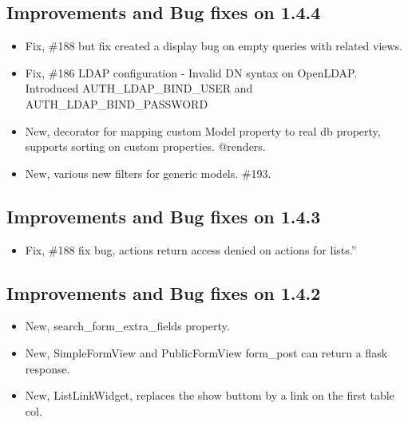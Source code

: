 \documentclass[letterpaper,10pt,english]{sphinxmanual}
\begin{document}
\subsection{Improvements and Bug fixes on 1.4.4}
\label{versions:improvements-and-bug-fixes-on-1-4-4}\begin{itemize}
\item {} 
Fix, \#188 but fix created a display bug on empty queries with related views.

\item {} 
Fix, \#186 LDAP configuration - Invalid DN syntax on OpenLDAP. Introduced AUTH\_LDAP\_BIND\_USER and AUTH\_LDAP\_BIND\_PASSWORD

\item {} 
New, decorator for mapping custom Model property to real db property, supports sorting on custom properties. @renders.

\item {} 
New, various new filters for generic models. \#193.

\end{itemize}


\subsection{Improvements and Bug fixes on 1.4.3}
\label{versions:improvements-and-bug-fixes-on-1-4-3}\begin{itemize}
\item {} 
Fix, \#188 fix bug, actions return access denied on actions for lists.''

\end{itemize}


\subsection{Improvements and Bug fixes on 1.4.2}
\label{versions:improvements-and-bug-fixes-on-1-4-2}\begin{itemize}
\item {} 
New, search\_form\_extra\_fields property.

\item {} 
New, SimpleFormView and PublicFormView form\_post can return a flask response.

\item {} 
New, ListLinkWidget, replaces the show buttom by a link on the first table col.

\end{itemize}
\end{document}
